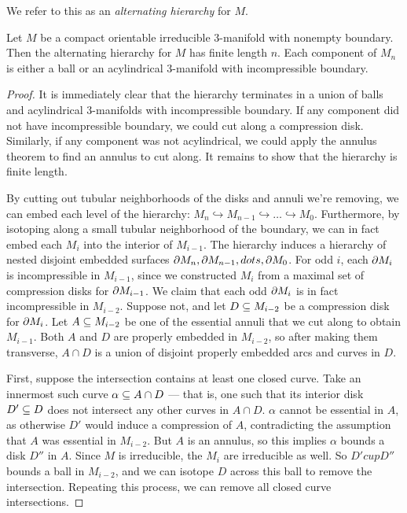 \begin{defn}

We refer to this as an \emph{alternating hierarchy} for $M$.

\end{defn}

\begin{lemma}

Let $M$ be a compact orientable irreducible 3-manifold with nonempty boundary.
Then the alternating hierarchy for $M$ has finite length $n$. Each component of
$M_n$ is either a ball or an acylindrical 3-manifold with incompressible
boundary.

\end{lemma}

\begin{proof}

It is immediately clear that the hierarchy terminates in a union of balls and
acylindrical 3-manifolds with incompressible boundary. If any component did not
have incompressible boundary, we could cut along a compression disk.
Similarly, if any component was not acylindrical, we could apply the annulus
theorem to find an annulus to cut along. It remains to show that the hierarchy
is finite length.

By cutting out tubular neighborhoods of the disks and annuli we're removing, we
can embed each level of the hierarchy: $M_n \hookrightarrow M_{n-1}
\hookrightarrow \dots \hookrightarrow M_0$. Furthermore, by isotoping along
a small tubular neighborhood of the boundary, we can in fact embed each $M_i$
into the interior of $M_{i-1}$. The hierarchy induces a hierarchy of nested
disjoint embedded surfaces $\partial M_n, \partial M_{n-1}, dots, \partial M_0$. For odd $i$,
each $\partial M_i$ is incompressible in $M_{i-1}$, since we constructed $M_i$ from
a maximal set of compression disks for $\partial M_{i-1}$.  We claim that each odd
$\partial M_i$ is in fact incompressible in $M_{i-2}$.  Suppose not, and let $D \subseteq
M_{i-2}$ be a compression disk for $\partial M_i$. Let $A \subseteq M_{i-2}$ be one of
the essential annuli that we cut along to obtain $M_{i-1}$. Both $A$ and $D$
are properly embedded in $M_{i-2}$, so after making them transverse, $A \cap D$
is a union of disjoint properly embedded arcs and curves in $D$.

First, suppose the intersection contains at least one closed curve. Take an
innermost such curve $\alpha \subseteq A \cap D$ --- that is, one such that its
interior disk $D' \subseteq D$ does not intersect any other curves in $A \cap D$.
$\alpha$ cannot be essential in $A$, as otherwise $D'$ would induce
a compression of $A$, contradicting the assumption that $A$ was essential in
$M_{i-2}$.  But $A$ is an annulus, so this implies $\alpha$ bounds a disk $D''$
in $A$.  Since $M$ is irreducible, the $M_i$ are irreducible as well.  So $D'
cup D''$ bounds a ball in $M_{i-2}$, and we can isotope $D$ across this ball to
remove the intersection.  Repeating this process, we can remove all closed
curve intersections.


\end{proof}
